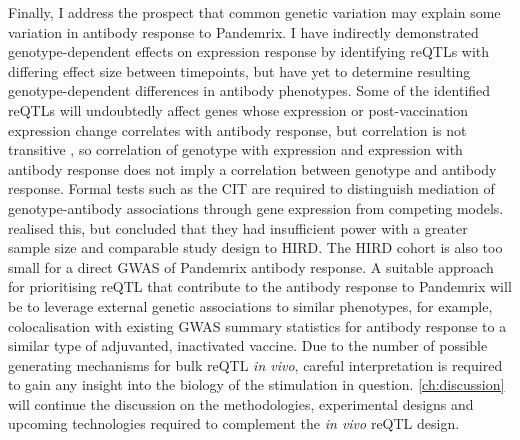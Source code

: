 Finally, I address the prospect that common genetic variation may explain some variation in antibody response to Pandemrix.
I have indirectly demonstrated genotype-dependent effects on expression response by identifying reQTLs with differing effect size between timepoints,
but have yet to determine resulting genotype-dependent differences in antibody phenotypes.
Some of the identified reQTLs will undoubtedly affect genes whose expression or post-vaccination expression change correlates with antibody response, 
but correlation is not transitive \autocite{langford2001PropertyBeingPositively},
so correlation of genotype with expression and expression with antibody response does not imply a correlation between genotype and antibody response.
Formal tests such as the CIT \autocite{millstein2009DisentanglingMolecularRelationships} are required to distinguish mediation of genotype-antibody associations through gene expression from competing models.
\textcite{franco2013IntegrativeGenomicAnalysis} realised this, but concluded that they had insufficient power with a greater sample size and comparable study design to \gls{HIRD}.
The \gls{HIRD} cohort is also too small for a direct \gls{GWAS} of Pandemrix antibody response.
A suitable approach for prioritising reQTL that contribute to the antibody response to Pandemrix will be to leverage external genetic associations to similar phenotypes,
for example, colocalisation with existing GWAS summary statistics for antibody response to a similar type of adjuvanted, inactivated vaccine.
%
%
Due to the number of possible generating mechanisms for bulk reQTL \textit{in vivo},
careful interpretation is required to gain any insight into the biology of the stimulation in question.
\cref{ch:discussion} will continue the discussion on the methodologies, experimental designs and upcoming technologies 
required to complement the \textit{in vivo} \gls{reQTL} design.

